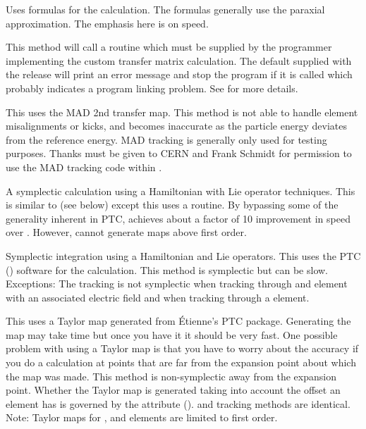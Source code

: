 \begin{description}

\item[\vn{Bmad_Standard}]
Uses formulas for the calculation. The formulas generally use the paraxial approximation. The
emphasis here is on speed.

\item[\vn{Custom}]
This method will call a routine  which must be supplied by the programmer
implementing the custom transfer matrix calculation. The default  supplied with
the \bmad release will print an error message and stop the program if it is called which probably
indicates a program linking problem.  See  for more details.

\item[\vn{MAD}]
This uses the MAD 2nd transfer map. This method is not able to handle element misalignments or
kicks, and becomes inaccurate as the particle energy deviates from the reference energy. MAD
tracking is generally only used for testing purposes. Thanks must be given to CERN and Frank Schmidt
for permission to use the MAD tracking code within \bmad.

\item[\vn{Symp_Lie_Bmad}]
A symplectic calculation using a Hamiltonian with Lie operator techniques.  This is similar to
 (see below) except this uses a \bmad routine. By bypassing some of the generality
inherent in PTC,  achieves about a factor of 10 improvement in speed over
. However,  cannot generate maps above first order.

\item[\vn{Symp_Lie_PTC}]
Symplectic integration using a Hamiltonian and Lie operators.  This uses the PTC
() software for the calculation.  This method is symplectic but can be
slow. Exceptions: The tracking is not symplectic when tracking through and element with an
associated electric field and when tracking through a  element.

\item[\vn{Taylor}]
This uses a Taylor map generated from \'Etienne's PTC
package. Generating the map may take time but once you have it it
should be very fast. One possible problem with using a Taylor map is
that you have to worry about the accuracy if you do a calculation at
points that are far from the expansion point about which the map was
made. This method is non-symplectic away from the expansion
point. Whether the Taylor map is generated taking into account the
offset an element has is governed by the 
attribute ().  and 
tracking methods are identical. Note: Taylor maps for , and
 elements are limited to first order.


\end{description}
